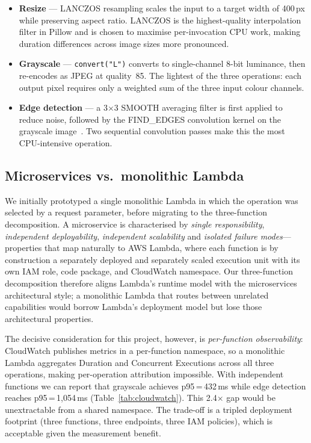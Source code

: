 \documentclass[10pt,twocolumn]{article}
\begin{document}
\begin{itemize}
  \item \textbf{Resize} --- LANCZOS resampling scales the input to a target
        width of 400\,px while preserving aspect ratio. LANCZOS is the
        highest-quality interpolation filter in Pillow and is chosen to
        maximise per-invocation CPU work, making duration differences
        across image sizes more pronounced.
  \item \textbf{Grayscale} --- \texttt{convert("L")} converts to single-channel
        8-bit luminance, then re-encodes as JPEG at quality~85. The lightest
        of the three operations: each output pixel requires only a weighted sum
        of the three input colour channels.
  \item \textbf{Edge detection} --- a 3$\times$3 SMOOTH averaging filter is
        first applied to reduce noise, followed by the FIND\_EDGES convolution
        kernel on the grayscale image~\cite{pillow:docs}. Two sequential
        convolution passes make this the most CPU-intensive operation.
\end{itemize}

\subsection{Microservices vs.\ monolithic Lambda}

We initially prototyped a single monolithic Lambda in which the operation was
selected by a request parameter, before migrating to the three-function
decomposition. A microservice is characterised by \textit{single
responsibility}, \textit{independent deployability}, \textit{independent
scalability} and \textit{isolated failure modes}---properties that map
naturally to AWS Lambda, where each function is by construction a separately
deployed and separately scaled execution unit with its own IAM role, code
package, and CloudWatch namespace. Our three-function decomposition therefore
aligns Lambda's runtime model with the microservices architectural style; a
monolithic Lambda that routes between unrelated capabilities would borrow
Lambda's deployment model but lose those architectural properties.

The decisive consideration for this project, however, is \textit{per-function
observability}: CloudWatch publishes metrics in a per-function namespace, so a
monolithic Lambda aggregates Duration and Concurrent Executions across all
three operations, making per-operation attribution impossible. With independent
functions we can report that grayscale achieves p95\,=\,432\,ms while edge
detection reaches p95\,=\,1{,}054\,ms (Table~\ref{tab:cloudwatch}). This 2.4$\times$
gap would be unextractable from a shared namespace. The trade-off is a
tripled deployment footprint (three functions, three endpoints, three IAM
policies), which is acceptable given the measurement benefit.
\end{document}

